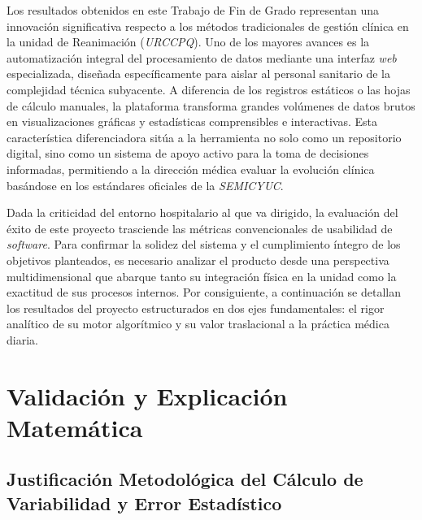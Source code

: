 Los resultados obtenidos en este Trabajo de Fin de Grado representan una innovación significativa respecto a los métodos tradicionales de gestión clínica en la unidad de Reanimación (\textit{URCCPQ}). Uno de los mayores avances es la automatización integral del procesamiento de datos mediante una interfaz \textit{web} especializada, diseñada específicamente para aislar al personal sanitario de la complejidad técnica subyacente. A diferencia de los registros estáticos o las hojas de cálculo manuales, la plataforma transforma grandes volúmenes de datos brutos en visualizaciones gráficas y estadísticas comprensibles e interactivas. Esta característica diferenciadora sitúa a la herramienta no solo como un repositorio digital, sino como un sistema de apoyo activo para la toma de decisiones informadas, permitiendo a la dirección médica evaluar la evolución clínica basándose en los estándares oficiales de la \textit{SEMICYUC}.

Dada la criticidad del entorno hospitalario al que va dirigido, la evaluación del éxito de este proyecto trasciende las métricas convencionales de usabilidad de \textit{software}. Para confirmar la solidez del sistema y el cumplimiento íntegro de los objetivos planteados, es necesario analizar el producto desde una perspectiva multidimensional que abarque tanto su integración física en la unidad como la exactitud de sus procesos internos. Por consiguiente, a continuación se detallan los resultados del proyecto estructurados en dos ejes fundamentales: el rigor analítico de su motor algorítmico y su valor traslacional a la práctica médica diaria.

\section{Validación y Explicación Matemática}
\subsection{Justificación Metodológica del Cálculo de Variabilidad y Error Estadístico}

